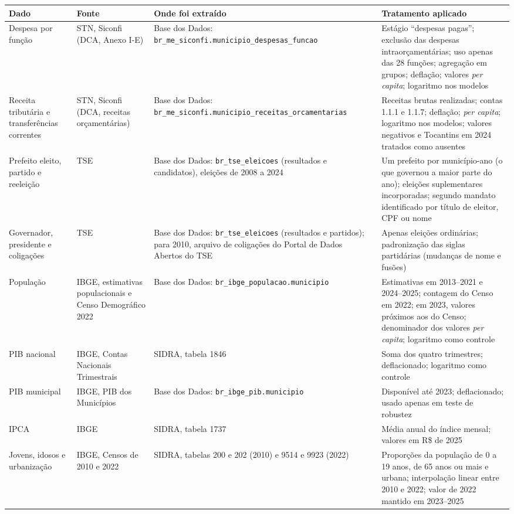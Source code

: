 \begin{quadro}[htbp]
\caption{Dados utilizados, fontes e tratamentos}\label{qua:fontes}
\centering
\footnotesize
\begin{tabular}{|>{\raggedright\arraybackslash}p{2.6cm}|>{\raggedright\arraybackslash}p{2.6cm}|>{\raggedright\arraybackslash}p{3.6cm}|>{\raggedright\arraybackslash}p{5.2cm}|}
\hline
\textbf{Dado} & \textbf{Fonte} & \textbf{Onde foi extraído} & \textbf{Tratamento aplicado} \\ \hline
Despesa por função & STN, Siconfi (DCA, Anexo I-E) & Base dos Dados: \nolinkurl{br_me_siconfi.municipio_despesas_funcao} & Estágio ``despesas pagas''; exclusão das despesas intraorçamentárias; uso apenas das 28 funções; agregação em grupos; deflação; valores \textit{per capita}; logaritmo nos modelos \\ \hline
Receita tributária e transferências correntes & STN, Siconfi (DCA, receitas orçamentárias) & Base dos Dados: \nolinkurl{br_me_siconfi.municipio_receitas_orcamentarias} & Receitas brutas realizadas; contas 1.1.1 e 1.1.7; deflação; \textit{per capita}; logaritmo nos modelos; valores negativos e Tocantins em 2024 tratados como ausentes \\ \hline
Prefeito eleito, partido e reeleição & TSE & Base dos Dados: \nolinkurl{br_tse_eleicoes} (resultados e candidatos), eleições de 2008 a 2024 & Um prefeito por município-ano (o que governou a maior parte do ano); eleições suplementares incorporadas; segundo mandato identificado por título de eleitor, CPF ou nome \\ \hline
Governador, presidente e coligações & TSE & Base dos Dados: \nolinkurl{br_tse_eleicoes} (resultados e partidos); para 2010, arquivo de coligações do Portal de Dados Abertos do TSE & Apenas eleições ordinárias; padronização das siglas partidárias (mudanças de nome e fusões) \\ \hline
População & IBGE, estimativas populacionais e Censo Demográfico 2022 & Base dos Dados: \nolinkurl{br_ibge_populacao.municipio} & Estimativas em 2013--2021 e 2024--2025; contagem do Censo em 2022; em 2023, valores próximos aos do Censo; denominador dos valores \textit{per capita}; logaritmo como controle \\ \hline
PIB nacional & IBGE, Contas Nacionais Trimestrais & SIDRA, tabela 1846 & Soma dos quatro trimestres; deflacionado; logaritmo como controle \\ \hline
PIB municipal & IBGE, PIB dos Municípios & Base dos Dados: \nolinkurl{br_ibge_pib.municipio} & Disponível até 2023; deflacionado; usado apenas em teste de robustez \\ \hline
IPCA & IBGE & SIDRA, tabela 1737 & Média anual do índice mensal; valores em R\$ de 2025 \\ \hline
Jovens, idosos e urbanização & IBGE, Censos de 2010 e 2022 & SIDRA, tabelas 200 e 202 (2010) e 9514 e 9923 (2022) & Proporções da população de 0 a 19 anos, de 65 anos ou mais e urbana; interpolação linear entre 2010 e 2022; valor de 2022 mantido em 2023--2025 \\ \hline
\end{tabular}
\end{quadro}

